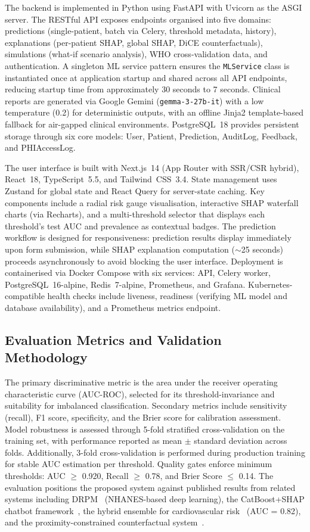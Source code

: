 \documentclass[conference]{IEEEtran}
\begin{document}
The backend is implemented in Python using FastAPI with Uvicorn as the ASGI server. The RESTful API exposes endpoints organised into five domains: predictions (single-patient, batch via Celery, threshold metadata, history), explanations (per-patient SHAP, global SHAP, DiCE counterfactuals), simulations (what-if scenario analysis), WHO cross-validation data, and authentication. A singleton ML service pattern ensures the \texttt{MLService} class is instantiated once at application startup and shared across all API endpoints, reducing startup time from approximately 30 seconds to 7 seconds. Clinical reports are generated via Google Gemini (\texttt{gemma-3-27b-it}) with a low temperature (0.2) for deterministic outputs, with an offline Jinja2 template-based fallback for air-gapped clinical environments. PostgreSQL~18 provides persistent storage through six core models: User, Patient, Prediction, AuditLog, Feedback, and PHIAccessLog.

The user interface is built with Next.js~14 (App Router with SSR/CSR hybrid), React~18, TypeScript~5.5, and Tailwind~CSS~3.4. State management uses Zustand for global state and React Query for server-state caching. Key components include a radial risk gauge visualisation, interactive SHAP waterfall charts (via Recharts), and a multi-threshold selector that displays each threshold's test AUC and prevalence as contextual badges. The prediction workflow is designed for responsiveness: prediction results display immediately upon form submission, while SHAP explanation computation ($\sim$25 seconds) proceeds asynchronously to avoid blocking the user interface. Deployment is containerised via Docker Compose with six services: API, Celery worker, PostgreSQL~16-alpine, Redis~7-alpine, Prometheus, and Grafana. Kubernetes-compatible health checks include liveness, readiness (verifying ML model and database availability), and a Prometheus metrics endpoint.

\subsection{Evaluation Metrics and Validation Methodology}

The primary discriminative metric is the area under the receiver operating characteristic curve (AUC-ROC), selected for its threshold-invariance and suitability for imbalanced classification. Secondary metrics include sensitivity (recall), F1 score, specificity, and the Brier score for calibration assessment. Model robustness is assessed through 5-fold stratified cross-validation on the training set, with performance reported as mean $\pm$ standard deviation across folds. Additionally, 3-fold cross-validation is performed during production training for stable AUC estimation per threshold. Quality gates enforce minimum thresholds: AUC $\geq$ 0.920, Recall $\geq$ 0.78, and Brier Score $\leq$ 0.14. The evaluation positions the proposed system against published results from related systems including DRPM~\cite{b3} (NHANES-based deep learning), the CatBoost+SHAP chatbot framework~\cite{b9}, the hybrid ensemble for cardiovascular risk~\cite{b7} (AUC = 0.82), and the proximity-constrained counterfactual system~\cite{b10}.
\end{document}
